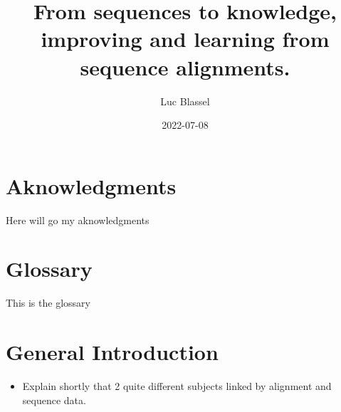 \documentclass[
  11pt,
  twoside]{scrbook}
\title{From sequences to knowledge, improving and learning from sequence alignments.}
\author{Luc Blassel}
\date{2022-07-08}
\providecommand{\tightlist}{%
  \setlength{\itemsep}{0pt}\setlength{\parskip}{0pt}}
\begin{document}
\maketitle




\pagestyle{empty}
\frontmatter

\chapter{Aknowledgments}
Here will go my aknowledgments
\lipsum[7-9]

\chapter{Glossary}
This is the glossary

\mainmatter

{
\setcounter{tocdepth}{1}
\tableofcontents
}
\listoffigures
\listoftables
\pagestyle{empty}

\pagestyle{fancy}
\fancyhf{}
\fancyhead[RO]{\rightmark}
\fancyfoot[CO,CE]{\thepage}

\hypertarget{general-introduction}{%
\chapter*{General Introduction}\label{general-introduction}}

\begin{itemize}
\tightlist
\item
  Explain shortly that 2 quite different subjects linked by alignment and sequence data.
\end{itemize}
\end{document}
